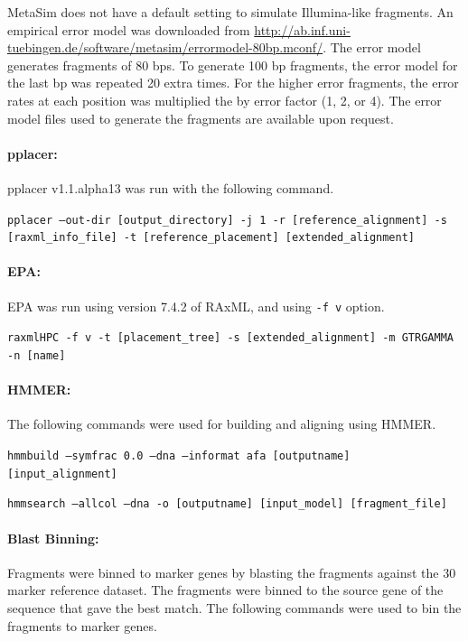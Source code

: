 MetaSim does not have a default setting to simulate Illumina-like fragments.  An empirical error model was downloaded from \url{http://ab.inf.uni-tuebingen.de/software/metasim/errormodel-80bp.mconf/}.  The error model generates fragments of 80 bps.  To generate 100 bp fragments, the error model for the last bp was repeated 20 extra times.  For the higher error fragments, the error rates at each position was multiplied the by error factor (1, 2, or 4). The error model files used to generate the fragments are available upon request.

\paragraph{pplacer:}

pplacer v1.1.alpha13 was run with the following command.

{\tt pplacer --out-dir [output\_directory] -j 1 -r [reference\_alignment] -s [raxml\_info\_file] -t [reference\_placement] [extended\_alignment]}

\paragraph{EPA: }

EPA was run using version 7.4.2 of RAxML, and using {\tt -f v} option.

{\tt raxmlHPC -f v -t [placement\_tree] -s [extended\_alignment] -m GTRGAMMA -n [name]}

\paragraph{HMMER: }

The following commands were used for building and aligning using HMMER. 

{\tt hmmbuild --symfrac 0.0 --dna --informat afa [outputname] [input\_alignment]}

{\tt hmmsearch --allcol --dna -o [outputname] [input\_model] [fragment\_file]}

\paragraph{Blast Binning: }\label{supp:blast_binning}

Fragments were binned to marker genes by blasting the fragments against the 30 marker reference dataset.  The fragments were binned to the source gene of the sequence that gave the best match.  The following commands were used to bin the fragments to marker genes.

